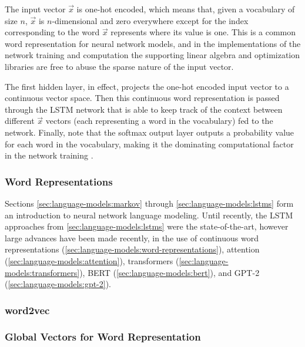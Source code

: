 The input vector $\vec x$ is one-hot encoded, which means that, given a vocabulary of size $n$, $\vec x$ is $n$-dimensional and zero everywhere except for the index corresponding to the word $\vec x$ represents where its value is one.
This is a common word representation for neural network models, and in the implementations of the network training and computation the supporting linear algebra and optimization libraries are free to abuse the sparse nature of the input vector.

The first hidden layer, in effect, projects the one-hot encoded input vector to a continuous vector space.
Then this continuous word representation is passed through the LSTM network that is able to keep track of the context between different $\vec x$ vectors (each representing a word in the vocabulary) fed to the network.
Finally, note that the softmax output layer outputs a probability value for each word in the vocabulary, making it the dominating computational factor in the network training \cite{Sundermeyer2012LSTMNN}.

\subsubsection{Word Representations}\label{sec:language-models:word-representations}
Sections \autoref{sec:language-models:markov} through \autoref{sec:language-models:lstms} form an introduction to neural network language modeling.
Until recently, the LSTM approaches from \autoref{sec:language-models:lstms} were the state-of-the-art, however large advances have been made recently, in the use of continuous word representations (\autoref{sec:language-models:word-representations}), attention (\autoref{sec:language-models:attention}), transformers (\autoref{sec:language-models:transformers}), BERT (\autoref{sec:language-models:bert}), and GPT-2 (\autoref{sec:language-models:gpt-2}).


\subsubsection{word2vec}\label{sec:language-models:word2vec}
\subsubsection{Global Vectors for Word Representation}\label{sec:language-models:glove}
